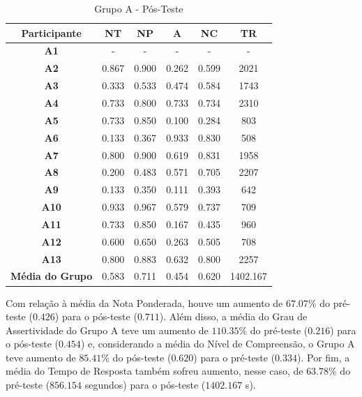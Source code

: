 \begin{table}[htbp]
	\centering
	\caption{Grupo A - Pós-Teste}		
	\begin{tabular}{|c|c|c|c|c|c|}
		\hline
		\rowcolor[HTML]{C0C0C0} 
		\textbf{Participante} & \textbf{NT} & \textbf{NP} & \textbf{A} & \textbf{NC} & \textbf{TR} \\ \hline
		\textbf{A1} & - & - & - & - & - \\ \hline
		\rowcolor[HTML]{EFEFEF} 
		\textbf{A2} & 0.867 & 0.900 & 0.262 & 0.599 & 2021 \\ \hline
		\textbf{A3} & 0.333 & 0.533 & 0.474 & 0.584 & 1743 \\ \hline
		\rowcolor[HTML]{EFEFEF} 
		\textbf{A4} & 0.733 & 0.800 & 0.733 & 0.734 & 2310 \\ \hline
		\textbf{A5} & 0.733 & 0.850 & 0.100 & 0.284 & 803 \\ \hline
		\rowcolor[HTML]{EFEFEF} 
		\textbf{A6} & 0.133 & 0.367 & 0.933 & 0.830 & 508 \\ \hline
		\textbf{A7} & 0.800 & 0.900 & 0.619 & 0.831 & 1958 \\ \hline
		\rowcolor[HTML]{EFEFEF} 
		\textbf{A8} & 0.200 & 0.483 & 0.571 & 0.705 & 2207 \\ \hline
		\textbf{A9} & 0.133 & 0.350 & 0.111 & 0.393 & 642 \\ \hline
		\rowcolor[HTML]{EFEFEF} 
		\textbf{A10} & 0.933 & 0.967 & 0.579 & 0.737 & 709 \\ \hline
		\textbf{A11} & 0.733 & 0.850 & 0.167 & 0.435 & 960 \\ \hline
		\rowcolor[HTML]{EFEFEF} 
		\textbf{A12} & 0.600 & 0.650 & 0.263 & 0.505 & 708 \\ \hline
		\textbf{A13} & 0.800 & 0.883 & 0.632 & 0.800 & 2257 \\ \hline
		\rowcolor[HTML]{EFEFEF} 
		\textbf{Média do Grupo} & 0.583 & 0.711 & 0.454 & 0.620 & 1402.167 \\ \hline
	\end{tabular}
	\label{tab:F1_H02-posteste}
\end{table}

Com relação à média da Nota Ponderada, houve um aumento de $67.07\%$ do pré-teste ($0.426$) para o pós-teste ($0.711$). Além disso, a média do Grau de Assertividade do Grupo A teve um aumento de $110.35\%$ do pré-teste ($0.216$) para o pós-teste ($0.454$) e, considerando a média do Nível de Compreensão, o Grupo A teve aumento de $85.41\%$ do pós-teste ($0.620$) para o pré-teste ($0.334$). Por fim, a média do Tempo de Resposta também sofreu aumento, nesse caso, de $63.78\%$ do pré-teste ($856.154$ segundos) para o pós-teste ($1402.167$ s).

